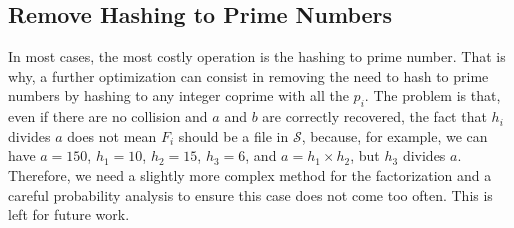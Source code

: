 \documentclass[11pt]{llncs}
\newcommand{\Oapp}{\ensuremath{\tilde{O}}}
\begin{document}

\subsection{Remove Hashing to Prime Numbers}

In most cases, the most costly operation is the hashing to prime number.
That is why, a further optimization can consist in removing the need to hash to prime numbers by hashing to any integer coprime with all the $p_i$.
The problem is that, even if there are no collision and $a$ and $b$ are correctly recovered, the fact that $h_i$ divides $a$ does not mean $F_i$ should be a file in $\mathcal{S}$, because, for example, we can have $a = 150$, $h_1 = 10$, $h_2 = 15$, $h_3 = 6$, and $a = h_1 \times h_2$, but $h_3$ divides $a$.
Therefore, we need a slightly more complex method for the factorization and a careful probability analysis to ensure this case does not come too often.
This is left for future work.
\end{document}
